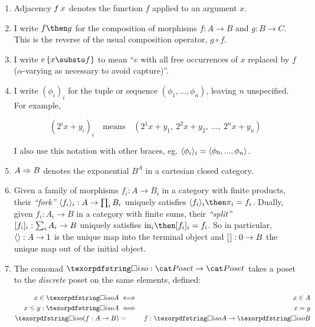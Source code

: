 \begin{enumerate}
\item Adjacency $f\<x$ denotes the function $f$ applied to an argument $x$.

\item I write $f \then g$ for the composition of morphisms $f : A \to B$ and $g
  : B \to C$. This is the reverse of the usual composition operator, $g \circ
  f$.

\item I write $\subst{e}{x \substo f}$ to mean ``$e$ with all free occurrences of $x$
  replaced by $f$ ($\alpha$-varying as necessary to avoid capture)''.

  \newcommand\iexpr{\phi}
\item I write $(\iexpr_i)_i$ for the tuple or sequence $(\iexpr_1,
  ..., \iexpr_n)$, leaving $n$ unspecified. For example,

  \nopagebreak[2]
  \[ (2^ix + y_i)_i \quad\text{means}\quad
  (2^1x + y_1,~ 2^2x + y_2,~ ...,~ 2^nx + y_n) \]

  \noindent
  I also use this notation with other braces, eg. $\fork{\iexpr_i}_i =
  \fork{\iexpr_0, ..., \iexpr_n}$.

\item $A \Rightarrow B$ denotes the exponential $B^A$ in a cartesian closed category.

\item Given a family of morphisms $f_i : A \to B_i$ in a category with finite
  products, their \emph{``fork''} $\langle{f_i}\rangle_i : A \to \textstyle\prod_{i} B_i$
  uniquely satisfies $\fork{f_i}_i \then \pi_i = f_i$. Dually, given $f_i : A_i
  \to B$ in a category with finite sums, their \emph{``split''} $[{f_i}]_i :
  \sum_i A_i \to B$ uniquely satisfies $\injc_i \then \krof{f_i}_i = f_i$.
  So in particular, $\langle{}\rangle : A \to 1$ is the unique map into the terminal
  object and $[{\kern .08em}] : 0 \to B$ the unique map out of the initial object.

\item The comonad $\iso : \Poset \to \Poset$ takes a poset to the
  \emph{discrete} poset on the same elements, defined:

  \begin{eqnarray*}
    x \in \isof A &\iff& x \in A\\
    x \le y : \isof A &\iff& x = y\\
    \isof(f : A \to B) &=& f : \isof A \to \isof B
  \end{eqnarray*}
\end{enumerate}




